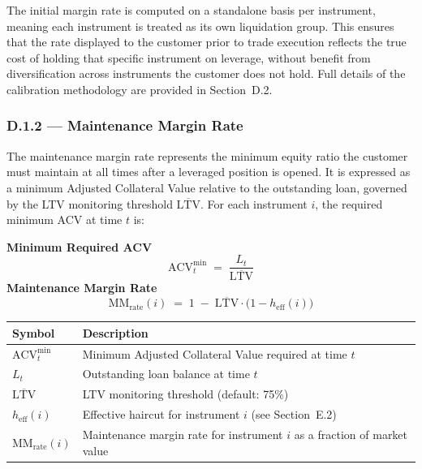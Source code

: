 \documentclass[9pt, a4paper]{extarticle}
\newenvironment{formulabox}{\par\addvspace{4pt}}{\par\addvspace{4pt}}
\newcommand{\vartableheader}{%
    \textbf{Symbol} & \textbf{Description}\\
}
\begin{document}
The initial margin rate is computed on a standalone basis per instrument, meaning
each instrument is treated as its own liquidation group. This ensures that the rate
displayed to the customer prior to trade execution reflects the true cost of holding
that specific instrument on leverage, without benefit from diversification across
instruments the customer does not hold. Full details of the calibration methodology
are provided in Section~D.2.

\subsubsection{D.1.2 — Maintenance Margin Rate}

The maintenance margin rate represents the minimum equity ratio the customer must
maintain at all times after a leveraged position is opened. It is expressed as a
minimum Adjusted Collateral Value relative to the outstanding loan, governed by the
LTV monitoring threshold $\overline{\mathrm{LTV}}$. For each instrument $i$, the
required minimum ACV at time $t$ is:

\begin{formulabox}
\textbf{Minimum Required ACV}
\begin{equation*}
    \mathrm{ACV}^{\min}_{t} \;=\; \frac{L_t}{\overline{\mathrm{LTV}}}
\end{equation*}
\textbf{Maintenance Margin Rate}
\begin{equation*}
    \mathrm{MM}_{\text{rate}}(i) \;=\; 1 \;-\; \overline{\mathrm{LTV}} \cdot \bigl(1 - h_{\mathrm{eff}}(i)\bigr)
\end{equation*}
\end{formulabox}

\begin{tabularx}{\linewidth}{lX}
\toprule
\vartableheader
\midrule
$\mathrm{ACV}^{\min}_{t}$   & Minimum Adjusted Collateral Value required at time $t$ \\
$L_t$                        & Outstanding loan balance at time $t$ \\
$\overline{\mathrm{LTV}}$    & LTV monitoring threshold (default: 75\%) \\
$h_{\mathrm{eff}}(i)$        & Effective haircut for instrument $i$ (see Section~E.2) \\
$\mathrm{MM}_{\text{rate}}(i)$ & Maintenance margin rate for instrument $i$ as a fraction of market value \\
\bottomrule
\end{tabularx}
\end{document}
